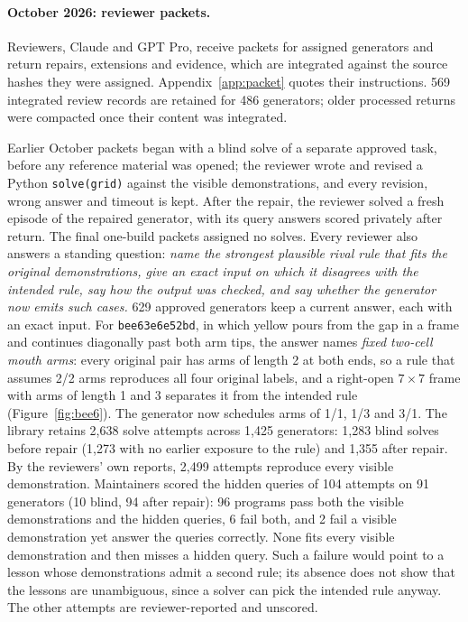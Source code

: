 \documentclass[11pt]{article}
\newcommand{\gen}[1]{\texttt{#1}}
\begin{document}
\paragraph{October 2026: reviewer packets.}

Reviewers, Claude and GPT Pro, receive packets for assigned generators and
return repairs, extensions and evidence, which are integrated against the
source hashes they were assigned. Appendix~\ref{app:packet} quotes their
instructions.
569 integrated review records are retained for 486 generators; older processed
returns were compacted once their content was integrated.

Earlier October packets began with a blind solve of a separate approved task,
before any reference material was opened; the reviewer wrote and revised a
Python \texttt{solve(grid)} against the visible demonstrations, and every
revision, wrong answer and timeout is kept. After the repair, the reviewer
solved a fresh episode of the repaired generator, with its query answers scored
privately after return. The final one-build packets assigned no solves. Every reviewer also answers a standing question: \emph{name the
strongest plausible rival rule that fits the original demonstrations, give an
exact input on which it disagrees with the intended rule, say how the output
was checked, and say whether the generator now emits such cases.} 629 approved
generators keep a current answer, each with an exact input. For
\gen{bee63e6e52bd}, in which yellow pours from the gap in a frame and continues
diagonally past both arm tips, the answer names \emph{fixed two-cell mouth arms}: every original pair has arms of
length 2 at both ends, so a rule that assumes 2/2 arms reproduces all four
original labels, and a right-open $7\times7$ frame with arms of length 1 and 3
separates it from the intended rule (Figure~\ref{fig:bee6}). The generator now
schedules arms of 1/1, 1/3 and 3/1. The library
retains 2,638 solve attempts across 1,425 generators: 1,283 blind solves before
repair (1,273 with no earlier exposure to the rule) and 1,355 after repair.
By the reviewers' own reports, 2,499 attempts reproduce every visible
demonstration. Maintainers scored the hidden queries of 104 attempts on 91
generators (10 blind, 94 after repair): 96 programs pass both the visible
demonstrations and the hidden queries, 6 fail both, and 2 fail a visible
demonstration yet answer the queries correctly. None fits every visible
demonstration and then misses a hidden query. Such a failure would point to a
lesson whose demonstrations admit a second rule; its absence does not show that
the lessons are unambiguous, since a solver can pick the intended rule anyway. The other
attempts are reviewer-reported and unscored.
\end{document}
